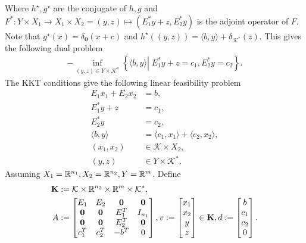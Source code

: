 \documentclass[12pt]{report}
\begin{document}
            Where $h^\star, g^\star$ are the conjugate of $h, g$ and $F^*: Y\times X_1 \rightarrow X_1 \times X_2 = (y, z)\mapsto (E_1^*y + z, E_2^*y)$ is the adjoint operator of $F$. 
            Note that $g^\star(x) = \delta_{\mathbf 0}(x + c)$ and $h^\star((y, z)) = \langle b, y\rangle + \delta_{\mathcal K^*}(z)$. 
            This gives the following dual problem 
            \begin{align*}
                - \inf_{(y, z) \in Y \times \mathcal K^*} \left\lbrace
                    \langle b, y\rangle 
                    \left | \;
                        E_1^*y + z = c_1, 
                        E^*_2y = c_2
                    \right.
                \right\rbrace. 
            \end{align*}
            The KKT conditions give the following linear feasibility problem 
            \begin{align*}
                E_1 x_1 + E_2 x_2 &= b, \\
                E_1^* y + z &= c_1, \\
                E_2^* y &= c_2, \\
                \langle b, y\rangle &= \langle c_1, x_1\rangle + \langle c_2, x_2\rangle, \\
                (x_1, x_2) &\in \mathcal K \times X_2, \\
                (y, z) &\in Y \times \mathcal K^*.
            \end{align*}
            Assuming $X_1 = \mathbb R^{n_1}, X_2 = \mathbb R^{n_2}, Y = \mathbb R^m$. 
            Define 
            \begin{align*}
                \mathbf K &:= \mathcal K \times \mathbb R^{n_2} \times \mathbb R^m \times \mathcal K^*, 
                \\
                A &:= \begin{bmatrix}
                    E_1 & E_2 & \mathbf 0 & \mathbf 0
                    \\
                    \mathbf 0 &\mathbf 0  & E_1^T & I_{n_1}
                    \\
                    \mathbf 0 &\mathbf 0  & E_2^T & \mathbf 0
                    \\
                    c_1^T & c_2^T & - b^T & 0
                \end{bmatrix}, 
                v := 
                \begin{bmatrix}
                    x_1\\ x_2 \\ y \\ z \\
                \end{bmatrix} \in \mathbf K, 
                d := 
                \begin{bmatrix}
                    b \\ c_1 \\ c_2 \\ 0
                \end{bmatrix}. 
            \end{align*}
\end{document}
